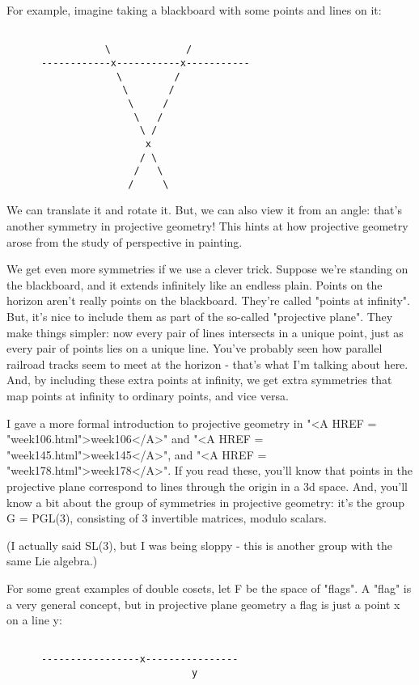 For example, imagine taking a blackboard with some points and lines 
on it:



\begin{verbatim}

                 \             /
      ------------x-----------x-----------
                   \         /
                    \       /
                     \     /
                      \   /
                       \ /
                        x
                       / \
                      /   \
                     /     \
\end{verbatim}
    

We can translate it and rotate it.  But, we can also view it from
an angle: that's another symmetry in projective geometry!  This
hints at how projective geometry arose from the study of perspective 
in painting.  

We get even more symmetries if we use a clever trick.  Suppose we're
standing on the blackboard, and it extends infinitely like an endless
plain.  Points on the horizon aren't really points on the blackboard.
They're called "points at infinity".  But, it's nice to
include them as part of the so-called "projective plane".
They make things simpler: now every pair of lines intersects in a
unique point, just as every pair of points lies on a unique line.
You've probably seen how parallel railroad tracks seem to meet at the
horizon - that's what I'm talking about here.  And, by including these
extra points at infinity, we get extra symmetries that map points at
infinity to ordinary points, and vice versa.

I gave a more formal introduction to projective geometry in "<A
HREF = "week106.html">week106</A>" and "<A HREF =
"week145.html">week145</A>", and "<A HREF =
"week178.html">week178</A>".  If you read these, you'll know that
points in the projective plane correspond to lines through the origin
in a 3d space.  And, you'll know a bit about the group of symmetries
in projective geometry: it's the group G = PGL(3), consisting of 3
invertible matrices, modulo scalars.  

(I actually said SL(3), but I
was being sloppy - this is another group with the same Lie algebra.)

For some great examples of double cosets, let F be the space of
"flags".  A "flag" is a very general concept, but
in projective plane geometry a flag is just a point x on a line y:


\begin{verbatim}

      -----------------x----------------
                                y
\end{verbatim}
    
